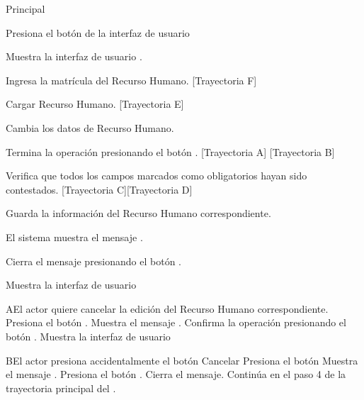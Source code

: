 \begin{UCtrayectoria}{Principal}

    \UCpaso[\UCactor] Presiona el botón  de la interfaz de usuario 

    \UCpaso Muestra la interfaz de usuario .

	\UCpaso Ingresa la matrícula del Recurso Humano. [Trayectoria F]    
    
    \UCpaso Cargar Recurso Humano. [Trayectoria E]
    
    \UCpaso[\UCactor] Cambia los datos de Recurso Humano.

    \UCpaso[\UCactor] Termina la operación presionando el botón . [Trayectoria A] [Trayectoria B]

    \UCpaso Verifica que todos los campos marcados como obligatorios hayan sido contestados. [Trayectoria C][Trayectoria D]

    \UCpaso Guarda la información del Recurso Humano correspondiente.

    \UCpaso El sistema muestra el mensaje .

    \UCpaso[\UCactor] Cierra el mensaje presionando el botón .

    \UCpaso Muestra la interfaz de usuario 
\end{UCtrayectoria}




\begin{UCtrayectoriaA}{A}{El actor quiere cancelar la edición  del Recurso Humano correspondiente.}
	\UCpaso[\UCactor] Presiona el botón .
    \UCpaso Muestra el mensaje .
    \UCpaso[\UCactor] Confirma la operación presionando el botón .
    \UCpaso Muestra la interfaz de usuario 
\end{UCtrayectoriaA}



\begin{UCtrayectoriaA}{B}{El actor presiona accidentalmente el botón Cancelar}
	\UCpaso[\UCactor] Presiona el botón 
    \UCpaso Muestra el mensaje .
    \UCpaso[\UCactor] Presiona el botón .
    \UCpaso Cierra el mensaje.
    \UCpaso Continúa en el paso 4 de la trayectoria principal del .
\end{UCtrayectoriaA}

